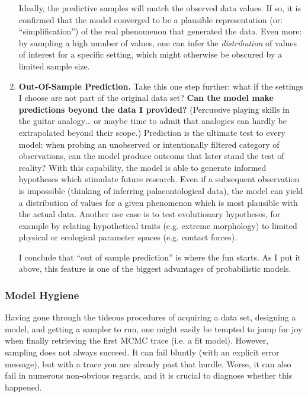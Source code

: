 \begin{enumerate}
Ideally, the predictive samples will match the observed data values.
If so, it is confirmed that the model converged to be a plausible representation (or: ``simplification'') of the real phenomenon that generated the data.
Even more: by sampling a high number of values, one can infer the \emph{distribution} of values of interest for a specific setting, which might otherwise be obscured by a limited sample size.


\item \textbf{Out-Of-Sample Prediction.}
\label{sec:org7e10c89}
Take this one step further: what if the settings I choose are not part of the original data set?
\textbf{Can the model make predictions beyond the data I provided?}
(Percussive playing skills in the guitar analogy\ldots{} or maybe time to admit that analogies can hardly be extrapolated beyond their scope.)
Prediction is the ultimate test to every model: when probing an unobserved or intentionally filtered category of observations, can the model produce outcoms that later stand the test of reality?
With this capability, the model is able to generate informed hypotheses which stimulate future research.
Even if a subsequent observation is impossible (thinking of inferring palaeontological data), the model can yield a distribution of values for a given phenomenon which is most plausible with the actual data.
Another use case is to test evolutionary hypotheses, for example by relating hypothetical traits (e.g. extreme morphology) to limited physical or ecological parameter spaces (e.g. contact forces).

I conclude that ``out of sample prediction'' is where the fun starts.
As I put it above, this feature is one of the biggest advantages of probabilistic models.
\end{enumerate}


\subsubsection{Model Hygiene}
\label{workflow:hygiene}
Having gone through the tideous procedures of acquiring a data set, designing a model, and getting a sampler to run, one might easily be tempted to jump for joy when finally retrieving the first MCMC trace (i.e. a fit model).
However, sampling does not always succeed.
It can fail bluntly (with an explicit error message), but with a trace you are already past that hurdle.
Worse, it can also fail in numerous non-obvious regards, and it is crucial to diagnose whether this happened.

